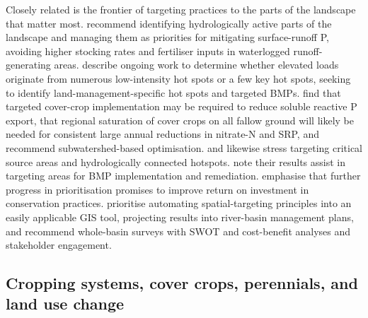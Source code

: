 Closely related is the frontier of targeting practices to the parts of the landscape that matter most. \textcite{Melland2008} recommend identifying hydrologically active parts of the landscape and managing them as priorities for mitigating surface-runoff P, avoiding higher stocking rates and fertiliser inputs in waterlogged runoff-generating areas. \textcite{Irvine2019} describe ongoing work to determine whether elevated loads originate from numerous low-intensity hot spots or a few key hot spots, seeking to identify land-management-specific hot spots and targeted BMPs. \textcite{Speir2022} find that targeted cover-crop implementation may be required to reduce soluble reactive P export, that regional saturation of cover crops on all fallow ground will likely be needed for consistent large annual reductions in nitrate-N and SRP, and recommend subwatershed-based optimisation. \textcite{Baulch2019} and \textcite{McDowell2015} likewise stress targeting critical source areas and hydrologically connected hotspots. \textcite{Brendel2019} note their results assist in targeting areas for BMP implementation and remediation. \textcite{Makhtoumi2025} emphasise that further progress in prioritisation promises to improve return on investment in conservation practices. \textcite{Kvítek2023} prioritise automating spatial-targeting principles into an easily applicable GIS tool, projecting results into river-basin management plans, and recommend whole-basin surveys with SWOT and cost-benefit analyses and stakeholder engagement.

\subsection{Cropping systems, cover crops, perennials, and land use change}

